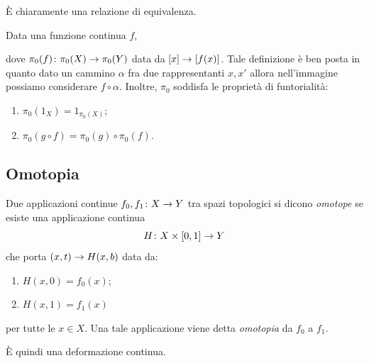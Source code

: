 \documentclass[a4paper]{article}
\begin{document}
È chiaramente una relazione di equivalenza.

Data una funzione continua \(f\),
\begin{center}
\end{center}
dove \(\pi_0(f) \colon \pi_0(X) \to \pi_0(Y)\)
data da \([x] \to [f(x)]\).
Tale definizione è ben posta in quanto dato un cammino \(\alpha\) fra due
rappresentanti \(x, x'\) allora nell'immagine possiamo considerare \(f \circ \alpha\).
Inoltre, \(\pi_0\) soddisfa le proprietà di funtorialità:
\begin{enumerate}
    \item \(\pi_0(1_X) = 1_{\pi_0(X)}\);
    \item \(\pi_0(g\circ f) = \pi_0(g) \circ \pi_0(f)\).
\end{enumerate}

\subsection{Omotopia}

\begin{radioactive}
\begin{snippetdefinition}{}
    Due applicazioni continue \(f_0, f_1 \colon X \to Y\) tra spazi topologici si dicono
    \emph{omotope} se esiste una applicazione continua
    \[
       H \colon X \times [0,1] \to Y
    \]
    che porta \((x, t) \to H(x, b)\) data da:
    \begin{enumerate}
        \item \(H(x, 0) = f_0(x)\);
        \item \(H(x, 1) = f_1(x)\)
    \end{enumerate}
    per tutte le \(x\in X\).
    Una tale applicazione viene detta \emph{omotopia} da \(f_0\) a \(f_1\).
\end{snippetdefinition}
\end{radioactive}

È quindi una deformazione continua.
\end{document}
